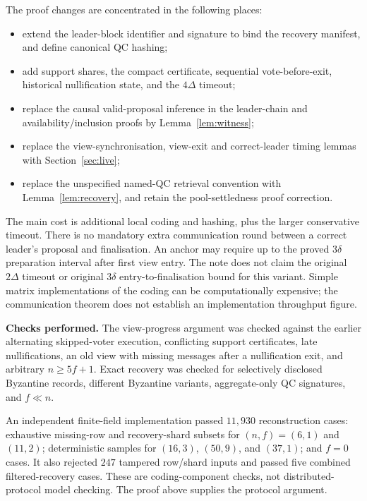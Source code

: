 \documentclass[11pt,a4paper]{article}
\theoremstyle{definition}
\begin{document}
\begin{samepage}
The proof changes are concentrated in the following places:
\begin{itemize}
\item extend the leader-block identifier and signature to bind the recovery
  manifest, and define canonical QC hashing;
\item add support shares, the compact certificate, sequential vote-before-exit,
  historical nullification state, and the \(4\Delta\) timeout;
\item replace the causal valid-proposal inference in the leader-chain and
  availability/inclusion proofs by Lemma~\ref{lem:witness};
\item replace the view-synchronisation, view-exit and correct-leader timing
  lemmas with Section~\ref{sec:live};
\item replace the unspecified named-QC retrieval convention with
  Lemma~\ref{lem:recovery}, and retain the pool-settledness proof correction.
\end{itemize}
\end{samepage}

The main cost is additional local coding and hashing, plus the larger
conservative timeout. There is no mandatory extra communication round
between a correct leader's proposal and finalisation. An anchor may require
up to the proved \(3\delta\) preparation interval after first view entry.
The note does not claim the original \(2\Delta\) timeout or original
\(3\delta\) entry-to-finalisation bound for this variant. Simple matrix
implementations of the coding can be computationally expensive; the
communication theorem does not establish an implementation throughput figure.

\textbf{Checks performed.} The view-progress argument was checked against
the earlier alternating skipped-voter execution, conflicting support
certificates, late nullifications, an old view with missing messages after
a nullification exit, and arbitrary \(n\ge5f+1\). Exact recovery was checked
for selectively disclosed Byzantine records, different Byzantine variants,
aggregate-only QC signatures, and \(f\ll n\).

An independent finite-field implementation passed \(11{,}930\)
reconstruction cases: exhaustive missing-row and recovery-shard subsets for
\((n,f)=(6,1)\) and \((11,2)\); deterministic samples for \((16,3)\),
\((50,9)\), and \((37,1)\); and \(f=0\) cases. It also rejected \(247\)
tampered row/shard inputs and passed five combined filtered-recovery cases.
These are coding-component checks, not distributed-protocol model checking.
The proof above supplies the protocol argument.
\end{document}
